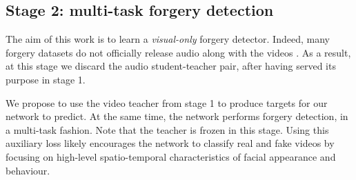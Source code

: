 \documentclass[10pt,twocolumn,letterpaper]{article}
\begin{document}
\begin{description}[wide,itemindent=\labelsep]
\end{description}

\subsection{Stage 2: multi-task forgery detection}

The aim of this work is to learn a \textit{visual-only} forgery detector. Indeed, many forgery datasets do not officially release audio along with the videos \cite{rossler2019faceforensics++, jiang2020deeperforensics, li2020celeb}. As a result, at this stage we discard the audio student-teacher pair, after having served its purpose in stage 1. 

We propose to use the video teacher from stage 1 to produce targets for our network to predict. At the same time, the network performs forgery detection, in a multi-task fashion. Note that the teacher is frozen in this stage. Using this auxiliary loss likely encourages the network to classify real and fake videos by focusing on high-level spatio-temporal characteristics of facial appearance and behaviour. 
\end{document}
